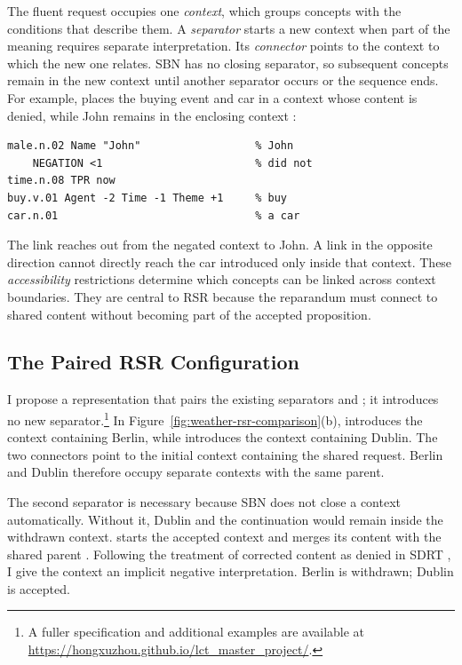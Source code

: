 \documentclass{article}
\begin{document}
The fluent request occupies one \emph{context}, which groups concepts with the
conditions that describe them. A \emph{separator} starts a new context when
part of the meaning requires separate interpretation. Its \emph{connector}
points to the context to which the new one relates. SBN has no closing
separator, so subsequent concepts remain in the new context until another
separator occurs or the sequence ends. For example,  places
the buying event and car in a context whose content is denied, while John
remains in the enclosing context
\citep{bosVariablefreeDiscourseRepresentation2021}:

\begin{lstlisting}[style=sbn]
male.n.02 Name "John"                  % John
    NEGATION <1                        % did not
time.n.08 TPR now
buy.v.01 Agent -2 Time -1 Theme +1     % buy
car.n.01                               % a car
\end{lstlisting}

The  link reaches out from the negated context to John. A
link in the opposite direction cannot directly reach the car introduced only
inside that context. These \emph{accessibility} restrictions determine which
concepts can be linked across context boundaries. They are central to RSR
because the reparandum must connect to shared content without becoming part of
the accepted proposition.

\subsection{The Paired RSR Configuration}
\label{sec:paired-configuration}

I propose a representation that pairs the existing separators
 and ; it introduces no new
separator.\footnote{A fuller
specification and additional examples are available at
\url{https://hongxuzhou.github.io/lct_master_project/}.} In
Figure~\ref{fig:weather-rsr-comparison}(b),  introduces the
context containing Berlin, while  introduces the context
containing Dublin. The two connectors point to the initial context containing
the shared request. Berlin and Dublin therefore occupy separate contexts with
the same parent.

The second separator is necessary because SBN does not close a context
automatically. Without it, Dublin and the continuation would remain inside
the withdrawn context.  starts the accepted context and
merges its content with the shared parent
\citep{bosSequenceNotationCatching2023}. Following the treatment of corrected
content as denied in SDRT
\citep{lascaridesAgreementDisputesCommitments2009}, I give the
 context an implicit negative interpretation. Berlin is
withdrawn; Dublin is accepted.
\end{document}
